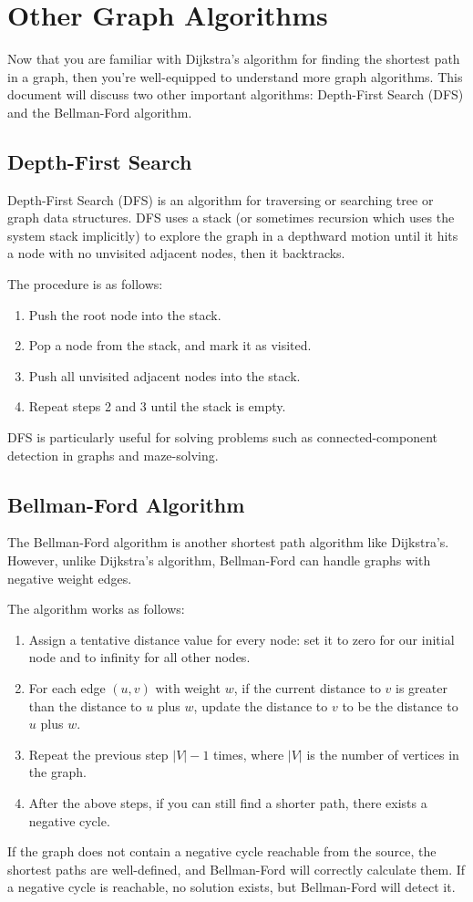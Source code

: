 \chapter{Other Graph Algorithms}

Now that you are familiar with Dijkstra's algorithm for finding the shortest path in a graph, then you're well-equipped to understand more graph algorithms. This document will discuss two other important algorithms: Depth-First Search (DFS) and the Bellman-Ford algorithm.

\section{Depth-First Search}

Depth-First Search (DFS) is an algorithm for traversing or searching tree or graph data structures. DFS uses a stack (or sometimes recursion which uses the system stack implicitly) to explore the graph in a depthward motion until it hits a node with no unvisited adjacent nodes, then it backtracks.

The procedure is as follows:

\begin{enumerate}
    \item Push the root node into the stack.
    \item Pop a node from the stack, and mark it as visited.
    \item Push all unvisited adjacent nodes into the stack.
    \item Repeat steps 2 and 3 until the stack is empty.
\end{enumerate}

DFS is particularly useful for solving problems such as connected-component detection in graphs and maze-solving.

\section{Bellman-Ford Algorithm}

The Bellman-Ford algorithm is another shortest path algorithm like Dijkstra's. However, unlike Dijkstra's algorithm, Bellman-Ford can handle graphs with negative weight edges. 

The algorithm works as follows:

\begin{enumerate}
    \item Assign a tentative distance value for every node: set it to zero for our initial node and to infinity for all other nodes.
    \item For each edge $(u, v)$ with weight $w$, if the current distance to $v$ is greater than the distance to $u$ plus $w$, update the distance to $v$ to be the distance to $u$ plus $w$.
    \item Repeat the previous step $|V| - 1$ times, where $|V|$ is the number of vertices in the graph.
    \item After the above steps, if you can still find a shorter path, there exists a negative cycle.
\end{enumerate}

If the graph does not contain a negative cycle reachable from the source, the shortest paths are well-defined, and Bellman-Ford will correctly calculate them. If a negative cycle is reachable, no solution exists, but Bellman-Ford will detect it.
